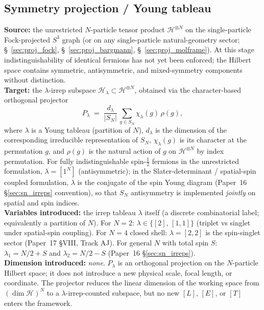 \subsection{Symmetry projection / Young tableau}
\label{sec:proj_symmetry_tableau}
\textbf{Source:} the unrestricted $N$-particle tensor product
$\mathcal{H}^{\otimes N}$ on the single-particle Fock-projected $S^3$
graph (or on any single-particle natural-geometry sector;
\S~\ref{sec:proj_fock}, \S~\ref{sec:proj_bargmann},
\S~\ref{sec:proj_molframe}).  At this stage indistinguishability of
identical fermions has not yet been enforced; the Hilbert space
contains symmetric, antisymmetric, and mixed-symmetry components
without distinction.\\
\textbf{Target:} the $\lambda$-irrep subspace
$\mathcal{H}_\lambda \subset \mathcal{H}^{\otimes N}$, obtained via
the character-based orthogonal projector
\[
  P_\lambda \;=\; \frac{d_\lambda}{|S_N|}\,\sum_{g \in S_N}
                  \chi_\lambda(g)\,\rho(g),
\]
where $\lambda$ is a Young tableau (partition of $N$), $d_\lambda$ is
the dimension of the corresponding irreducible representation of
$S_N$, $\chi_\lambda(g)$ is its character at the permutation $g$, and
$\rho(g)$ is the natural action of $g$ on $\mathcal{H}^{\otimes N}$
by index permutation.  For fully indistinguishable spin-$\tfrac{1}{2}$
fermions in the unrestricted formulation, $\lambda = [1^N]$
(antisymmetric); in the Slater-determinant / spatial-spin coupled
formulation, $\lambda$ is the conjugate of the spin Young diagram
(Paper~16 §\ref{sec:sn_irreps} convention), so that $S_N$
antisymmetry is implemented \emph{jointly} on spatial and spin
indices.\\
\textbf{Variables introduced:} the irrep tableau $\lambda$ itself
(a discrete combinatorial label; equivalently a partition of $N$).
For $N=2$: $\lambda \in \{[2],\,[1,1]\}$ (triplet vs singlet under
spatial-spin coupling).  For $N=4$ closed shell: $\lambda = [2,2]$
is the spin-singlet sector (Paper~17 §VIII, Track AJ).  For general
$N$ with total spin $S$: $\lambda_1 = N/2 + S$ and
$\lambda_2 = N/2 - S$ (Paper~16 §\ref{sec:sn_irreps}).\\
\textbf{Dimension introduced:} \emph{none}.  $P_\lambda$ is an
orthogonal projection on the $N$-particle Hilbert space; it does not
introduce a new physical scale, focal length, or coordinate.  The
projector reduces the linear dimension of the working space from
$(\dim\mathcal{H})^N$ to a $\lambda$-irrep-counted subspace, but no
new $[L]$, $[E]$, or $[T]$ enters the framework.\\
